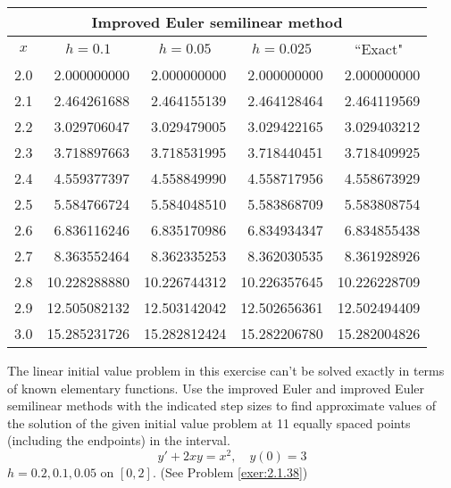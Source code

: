 \documentclass{ximera}
\begin{document}
\begin{problem}
\begin{solution}
{\small
\begin{tabular}{|c|r|r|r|r|}
\hline
\multicolumn{5}{|c|}{Improved Euler semilinear method}\\\hline
\multicolumn{1}{|c|}{$x$}&
\multicolumn{1}{|c|}{$h=0.1$}&
\multicolumn{1}{|c|}{$h=0.05$}&
\multicolumn{1}{|c|}{$h=0.025$}&
\multicolumn{1}{|c|}{``Exact"}\\ \hline
2.0 &  2.000000000 &  2.000000000 &  2.000000000 &  2.000000000 \\
2.1 &  2.464261688 &  2.464155139 &  2.464128464 &  2.464119569 \\
2.2 &  3.029706047 &  3.029479005 &  3.029422165 &  3.029403212 \\
2.3 &  3.718897663 &  3.718531995 &  3.718440451 &  3.718409925 \\
2.4 &  4.559377397 &  4.558849990 &  4.558717956 &  4.558673929 \\
2.5 &  5.584766724 &  5.584048510 &  5.583868709 &  5.583808754 \\
2.6 &  6.836116246 &  6.835170986 &  6.834934347 &  6.834855438 \\
2.7 &  8.363552464 &  8.362335253 &  8.362030535 &  8.361928926 \\
2.8 & 10.228288880 & 10.226744312 & 10.226357645 & 10.226228709 \\
2.9 & 12.505082132 & 12.503142042 & 12.502656361 & 12.502494409 \\
3.0 & 15.285231726 & 15.282812424 & 15.282206780 & 15.282004826 \\
\hline
\end{tabular}}
\end{solution}
\end{problem}

\begin{problem}\label{exer:3.2.15} The linear initial value problem in this exercise can't be solved exactly in terms of known elementary functions. Use the improved Euler and improved Euler semilinear methods with the indicated step sizes to find approximate values of the solution of the given initial value problem at 11 equally spaced points (including the endpoints) in the interval.
$$y'+2xy=x^2,\quad y(0)=3$$
$h=0.2,0.1,0.05$ on $[0,2]$. (See Problem \ref{exer:2.1.38})
\end{problem}
\end{document}
